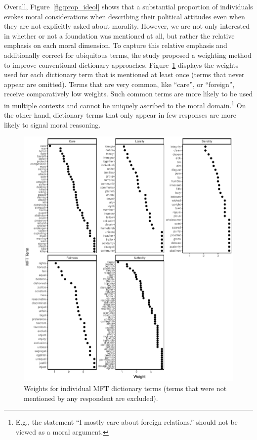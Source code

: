 \documentclass[12pt]{article}
\begin{document}
Overall, Figure~\ref{fig:prop_ideol} shows that a substantial proportion of individuals evokes moral considerations when describing their political attitudes even when they are not explicitly asked about morality. However, we are not only interested in whether or not a foundation was mentioned at all, but rather the relative emphasis on each moral dimension. To capture this relative emphasis and additionally correct for ubiquitous terms, the study proposed a weighting method to improve conventional dictionary approaches. Figure~\ref{fig:mft_weights} displays the weights used for each dictionary term that is mentioned at least once (terms that never appear are omitted). Terms that are very common, like ``care'', or ``foreign'', receive comparatively low weights. Such common terms are more likely to be used in multiple contexts and cannot be uniquely ascribed to the moral domain.\footnote{E.g., the statement ``I mostly care about foreign relations.'' should not be viewed as a moral argument.} On the other hand, dictionary terms that only appear in few responses are more likely to signal moral reasoning.

\begin{figure}[ht]\centering
\includegraphics{../calc/fig/app_mftweights.pdf}
\caption{Weights for individual MFT dictionary terms (terms that were not mentioned by any respondent are excluded).}\label{fig:mft_weights}
\end{figure}
\end{document}

